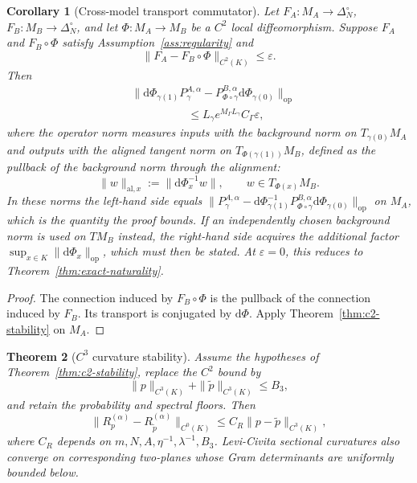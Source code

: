 \documentclass[11pt]{article}
\newtheorem{theorem}{Theorem}[section]
\newtheorem{corollary}[theorem]{Corollary}
\theoremstyle{definition}
\theoremstyle{remark}
\newcommand{\simplex}{\Delta_{N}^{\circ}}
\newcommand{\op}{\mathrm{op}}
\newcommand{\dd}{\mathrm{d}}
\begin{document}
\begin{corollary}[Cross-model transport commutator]\label{cor:cross-model-commutator}
Let $F_A:M_A\to\simplex$, $F_B:M_B\to\simplex$, and let $\Phi:M_A\to M_B$ be a $C^2$ local diffeomorphism. Suppose $F_A$ and $F_B\circ\Phi$ satisfy Assumption~\ref{ass:regularity} and
\begin{equation}
    \|F_A-F_B\circ\Phi\|_{C^2(K)}\le\varepsilon.
\end{equation}
Then
\begin{equation}
\begin{split}
    &\bigl\|\dd\Phi_{\gamma(1)}P_\gamma^{A,\alpha}
    -P_{\Phi\circ\gamma}^{B,\alpha}\dd\Phi_{\gamma(0)}\bigr\|_{\op}\\
    &\hspace{5em}\le L_\gamma e^{M_\Gamma L_\gamma}C_\Gamma\varepsilon,
\end{split}
\label{eq:commutator-bound}
\end{equation}
where the operator norm measures inputs with the background norm on $T_{\gamma(0)}M_A$ and outputs with the \emph{aligned} tangent norm on $T_{\Phi(\gamma(1))}M_B$, defined as the pullback of the background norm through the alignment:
\begin{equation}
    \|w\|_{\mathrm{al},x}:=\|\dd\Phi_x^{-1}w\|,
    \qquad w\in T_{\Phi(x)}M_B .
\end{equation}
In these norms the left-hand side equals
$\|P_\gamma^{A,\alpha}-\dd\Phi_{\gamma(1)}^{-1}P_{\Phi\circ\gamma}^{B,\alpha}\dd\Phi_{\gamma(0)}\|_{\op}$
on $M_A$, which is the quantity the proof bounds. If an independently chosen background norm is used on $TM_B$ instead, the right-hand side acquires the additional factor $\sup_{x\in K}\|\dd\Phi_x\|_{\op}$, which must then be stated. At $\varepsilon=0$, this reduces to Theorem~\ref{thm:exact-naturality}.
\end{corollary}

\begin{proof}
The connection induced by $F_B\circ\Phi$ is the pullback of the connection induced by $F_B$. Its transport is conjugated by $\dd\Phi$. Apply Theorem~\ref{thm:c2-stability} on $M_A$.
\end{proof}

\begin{theorem}[$C^3$ curvature stability]\label{thm:c3-curvature}
Assume the hypotheses of Theorem~\ref{thm:c2-stability}, replace the $C^2$ bound by
\begin{equation}
    \|p\|_{C^3(K)}+\|\widetilde p\|_{C^3(K)}\le B_3,
\end{equation}
and retain the probability and spectral floors. Then
\begin{equation}
    \|R_p^{(\alpha)}-R_{\widetilde p}^{(\alpha)}\|_{C^0(K)}
    \le C_R\|p-\widetilde p\|_{C^3(K)},
\end{equation}
where $C_R$ depends on $m,N,A,\eta^{-1},\lambda^{-1},B_3$. Levi-Civita sectional curvatures also converge on corresponding two-planes whose Gram determinants are uniformly bounded below.
\end{theorem}
\end{document}
